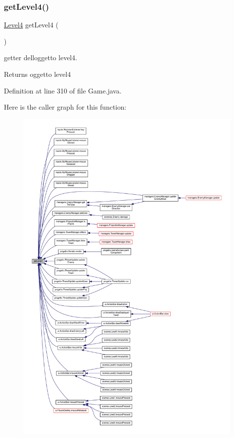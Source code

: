 \subsubsection{\texorpdfstring{get\+Level4()}{getLevel4()}}
{\footnotesize\ttfamily \hyperlink{classscenes_1_1_level4}{Level4} get\+Level4 (\begin{DoxyParamCaption}{ }\end{DoxyParamCaption})}



getter dell\textquotesingle{}oggetto level4. 

\begin{DoxyReturn}{Returns}
oggetto level4 
\end{DoxyReturn}


Definition at line 310 of file Game.\+java.

Here is the caller graph for this function\+:\nopagebreak
\begin{figure}[H]
\begin{center}
\leavevmode
\includegraphics[width=350pt]{classprogetto_1_1_game_a09e02ae6992f3328be34c9062ef142f8_icgraph}
\end{center}
\end{figure}
\mbox{\label{classprogetto_1_1_game_a32527bf330947f1c1d1f5a7da9d12940}} 
